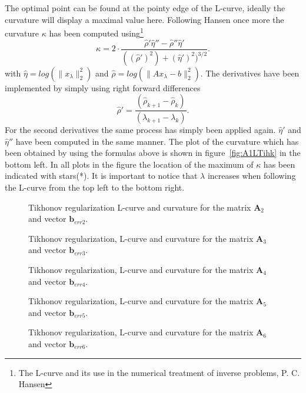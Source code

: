 The optimal point can be found at the pointy edge of the L-curve, ideally the curvature will display a maximal value here. Following Hansen once more the curvature $\kappa$ has been computed using\footnote{The L-curve and its use in the numerical treatment of inverse problems, P. C. Hansen}
\begin{equation}
\kappa = 2 \cdot \frac{\hat{\rho}'\hat{\eta}''- \hat{\rho}''\hat{\eta}' }{((\hat{\rho}')^2)+ (\hat{\eta}')^2)^{3/2} }.
\end{equation}
with $\hat{\eta} = log(\|x_{\lambda}\|_2^2)$ and $\hat{\rho} = log(\|Ax_{\lambda} - b\|_2^2)$. The derivatives have been implemented by simply using right forward differences
\begin{equation}
\hat{\rho}' = \frac{(\hat{\rho}_{k+1} - \hat{\rho}_{k})}{(\lambda_{k+1} - \lambda_{k})}.
\end{equation}
For the second derivatives the same process has simply been applied again. $\hat{\eta}'$ and $\hat{\eta}''$ have been computed in the same manner. The plot of the curvature which has been obtained by using the formulas above is shown in figure~\ref{fig:A1LTihk} in the bottom left. In all plots in the figure the location of the maximum of $\kappa$ has been indicated with stars(*). It is important to notice that $\lambda$ increases when following the L-curve from the top left to the bottom right.
\begin{figure}


\caption{Tikhonov regularization L-curve and curvature for the matrix $\mathbf{A}_{2}$ and vector $\mathbf{b}_{err2}$.}
\label{fig:A2Tikh}
\end{figure}
\begin{figure}


\caption{Tikhonov regularization, L-curve and curvature for the matrix $\mathbf{A}_{3}$ and vector $\mathbf{b}_{err3}$.}
\label{fig:A3Tikh}
\end{figure}
\begin{figure}


\caption{Tikhonov regularization, L-curve and curvature for the matrix $\mathbf{A}_{4}$ and vector $\mathbf{b}_{err4}$.}
\label{fig:A4Tikh}
\end{figure}
\begin{figure}


\caption{Tikhonov regularization, L-curve and curvature for the matrix $\mathbf{A}_{5}$ and vector $\mathbf{b}_{err5}$.}
\label{fig:A5Tikh}
\end{figure}
\begin{figure}


\caption{Tikhonov regularization, L-curve and curvature for the matrix $\mathbf{A}_{6}$ and vector $\mathbf{b}_{err6}$.}
\label{fig:A6Tikh}
\end{figure}

